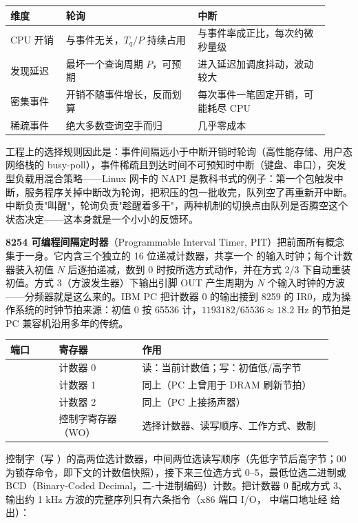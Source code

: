\begin{longtable}{L{0.16\linewidth}L{0.38\linewidth}L{0.38\linewidth}}
\toprule
维度 & 轮询 & 中断 \\
\midrule
CPU 开销 & 与事件无关，$T_q/P$ 持续占用 & 与事件率成正比，每次约微秒量级 \\
发现延迟 & 最坏一个查询周期 $P$，可预期 & 进入延迟加调度抖动，波动较大 \\
密集事件 & 开销不随事件增长，反而划算 & 每次事件一笔固定开销，可能耗尽 CPU \\
稀疏事件 & 绝大多数查询空手而归 & 几乎零成本 \\
\bottomrule
\end{longtable}

工程上的选择规则因此是：事件间隔远小于中断开销时轮询（高性能存储、用户态网络栈的 busy-poll），事件稀疏且到达时间不可预知时中断（键盘、串口），突发型负载用混合策略——Linux 网卡的 NAPI 是教科书式的例子：第一个包触发中断，服务程序关掉中断改为轮询，把积压的包一批收完，队列空了再重新开中断。中断负责"叫醒"，轮询负责"趁醒着多干"，两种机制的切换点由队列是否腾空这个状态决定——这本身就是一个小小的反馈环。


\textbf{8254 可编程间隔定时器}（Programmable Interval Timer, PIT）把前面所有概念集于一身。它内含三个独立的 16 位递减计数器，共享一个  的输入时钟；每个计数器装入初值 $N$ 后逐拍递减，数到 0 时按所选方式动作，并在方式 2/3 下自动重装初值。方式 3（方波发生器）下输出引脚 OUT 产生周期为 $N$ 个输入时钟的方波——分频器就是这么来的。IBM PC 把计数器 0 的输出接到 8259 的 IR0，成为操作系统的时钟节拍来源：初值 0 按 65536 计，$1193182/65536 \approx 18.2$ Hz 的节拍是 PC 兼容机沿用多年的传统。

\begin{longtable}{L{0.14\linewidth}L{0.24\linewidth}L{0.55\linewidth}}
\toprule
端口 & 寄存器 & 作用 \\
\midrule
{} & 计数器 0 & 读：当前计数值；写：初值低/高字节 \\
 & 计数器 1 & 同上（PC 上曾用于 DRAM 刷新节拍） \\
 & 计数器 2 & 同上（PC 上接扬声器） \\
 & 控制字寄存器（WO） & 选择计数器、读写顺序、工作方式、数制 \\
\bottomrule
\end{longtable}

控制字（写 ）的高两位选计数器，中间两位选读写顺序（先低字节后高字节；00 为锁存命令，即下文的计数值快照），接下来三位选方式 0--5，最低位选二进制或 BCD（Binary-Coded Decimal，二-十进制编码）计数。把计数器 0 配成方式 3、输出约 1 kHz 方波的完整序列只有六条指令（x86 端口 I/O， 中端口地址经  给出）：

